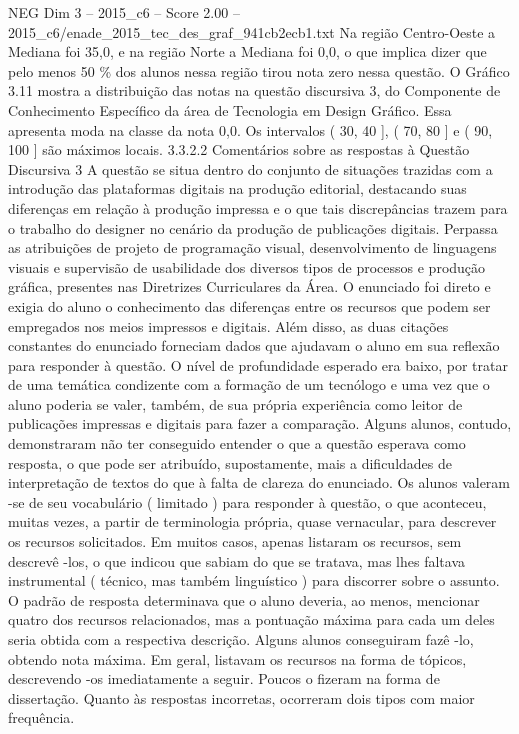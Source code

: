 \begin{textsample}{NEG Dim 3 – 2015\_c6 – Score 2.00 – 2015\_c6/enade\_2015\_tec\_des\_graf\_941cb2ecb1.txt}
Na região Centro-Oeste a Mediana foi 35,0, e na região Norte a Mediana foi 0,0, o que implica dizer que pelo menos 50 \% dos alunos nessa região tirou nota zero nessa questão.
O Gráfico 3.11 mostra a distribuição das notas na questão discursiva 3, do Componente de Conhecimento Específico da área de Tecnologia em Design Gráfico.
Essa apresenta moda na classe da nota 0,0.
Os intervalos ( 30, 40 ], ( 70, 80 ] e ( 90, 100 ] são máximos locais. 3.3.2.2 Comentários sobre as respostas à Questão Discursiva 3 A questão se situa dentro do conjunto de situações trazidas com a introdução das plataformas digitais na produção editorial, destacando suas diferenças em relação à produção impressa e o que tais discrepâncias trazem para o trabalho do designer no cenário da produção de publicações digitais.
Perpassa as atribuições de projeto de programação visual, desenvolvimento de linguagens visuais e supervisão de usabilidade dos diversos tipos de processos e produção gráfica, presentes nas Diretrizes Curriculares da Área.
O enunciado foi direto e exigia do aluno o conhecimento das diferenças entre os recursos que podem ser empregados nos meios impressos e digitais.
Além disso, as duas citações constantes do enunciado forneciam dados que ajudavam o aluno em sua reflexão para responder à questão.
O nível de profundidade esperado era baixo, por tratar de uma temática condizente com a formação de um tecnólogo e uma vez que o aluno poderia se valer, também, de sua própria experiência como leitor de publicações impressas e digitais para fazer a comparação.
Alguns alunos, contudo, demonstraram não ter conseguido entender o que a questão esperava como resposta, o que pode ser atribuído, supostamente, mais a dificuldades de interpretação de textos do que à falta de clareza do enunciado.
Os alunos valeram -se de seu vocabulário ( limitado ) para responder à questão, o que aconteceu, muitas vezes, a partir de terminologia própria, quase vernacular, para descrever os recursos solicitados.
Em muitos casos, apenas listaram os recursos, sem descrevê -los, o que indicou que sabiam do que se tratava, mas lhes faltava instrumental ( técnico, mas também linguístico ) para discorrer sobre o assunto.
O padrão de resposta determinava que o aluno deveria, ao menos, mencionar quatro dos recursos relacionados, mas a pontuação máxima para cada um deles seria obtida com a respectiva descrição.
Alguns alunos conseguiram fazê -lo, obtendo nota máxima.
Em geral, listavam os recursos na forma de tópicos, descrevendo -os imediatamente a seguir.
Poucos o fizeram na forma de dissertação.
Quanto às respostas incorretas, ocorreram dois tipos com maior frequência.

\end{textsample}
